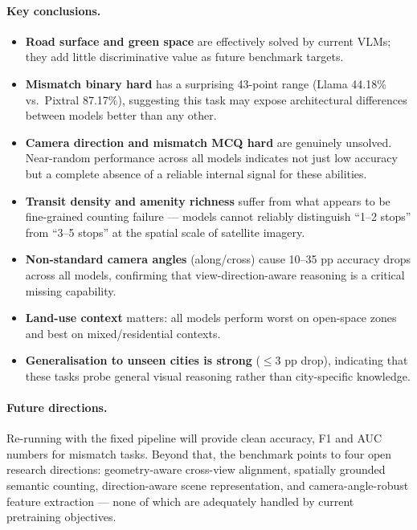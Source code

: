 \documentclass[11pt,a4paper]{article}
\begin{document}
\paragraph{Key conclusions.}
\begin{itemize}[itemsep=3pt]
  \item \textbf{Road surface and green space} are effectively solved
        by current VLMs; they add little discriminative value as future
        benchmark targets.
  \item \textbf{Mismatch binary hard} has a surprising 43-point range
        (Llama 44.18\% vs.\ Pixtral 87.17\%), suggesting this task
        may expose architectural differences between models better
        than any other.
  \item \textbf{Camera direction and mismatch MCQ hard} are genuinely
        unsolved. Near-random performance across all models indicates
        not just low accuracy but a complete absence of a reliable
        internal signal for these abilities.
  \item \textbf{Transit density and amenity richness} suffer from
        what appears to be fine-grained counting failure — models
        cannot reliably distinguish ``1--2 stops'' from ``3--5 stops''
        at the spatial scale of satellite imagery.
  \item \textbf{Non-standard camera angles} (along/cross) cause
        10--35 pp accuracy drops across all models, confirming that
        view-direction-aware reasoning is a critical missing capability.
  \item \textbf{Land-use context} matters: all models perform worst
        on open-space zones and best on mixed/residential contexts.
  \item \textbf{Generalisation to unseen cities is strong} ($\leq$3 pp drop),
        indicating that these tasks probe general visual reasoning
        rather than city-specific knowledge.
\end{itemize}

\paragraph{Future directions.}
Re-running with the fixed pipeline will provide clean accuracy, F1 and AUC
numbers for mismatch tasks. Beyond that, the benchmark points to four open
research directions: geometry-aware cross-view alignment, spatially grounded
semantic counting, direction-aware scene representation, and
camera-angle-robust feature extraction — none of which are adequately
handled by current pretraining objectives.
\end{document}
